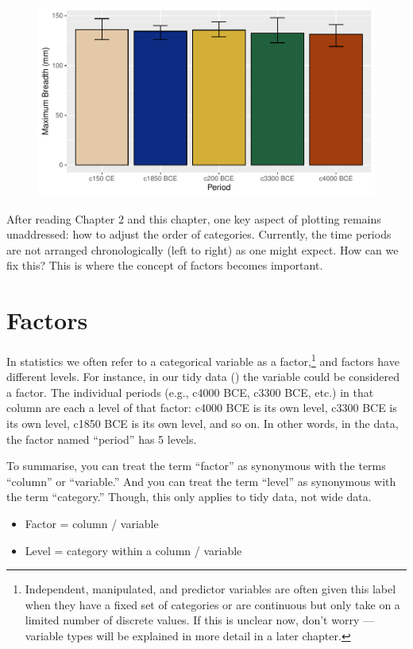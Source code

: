 \vspace{2em}

\begin{figure}[H]
\includegraphics[scale = .75]{graphics/ch3Figs/bar_4.pdf}
\end{figure}

After reading Chapter 2 and this chapter, one key aspect of plotting remains unaddressed: how to adjust the order of categories. Currently, the time periods are not arranged chronologically (left to right) as one might expect. How can we fix this? This is where the concept of factors becomes important.

\section{Factors}

In statistics we often refer to a categorical variable as a \gls{factor},\footnote{Independent, manipulated, and predictor variables are often given this label when they have a fixed set of categories or are continuous but only take on a limited number of discrete values. If this is unclear now, don't worry — variable types will be explained in more detail in a later chapter.} and factors have different \glspl{level}.  For instance, in our tidy data () the variable  could be considered a factor. The individual periods (e.g., c4000 BCE, c3300 BCE, etc.) in that column are each a level of that factor: c4000 BCE is its own level, c3300 BCE is its own level, c1850 BCE is its own level, and so on. In other words, in the  data, the factor named ``period'' has 5 levels.

To summarise, you can treat the term ``factor'' as synonymous with the terms ``column'' or ``variable.'' And you can treat the term ``level'' as synonymous with the term ``category.'' Though, this only applies to tidy data, not wide data.
{
\begin{itemize}
  \setlength\itemsep{-1em}
    \item Factor = column / variable
    \item Level = category within a column / variable
\end{itemize}
}

